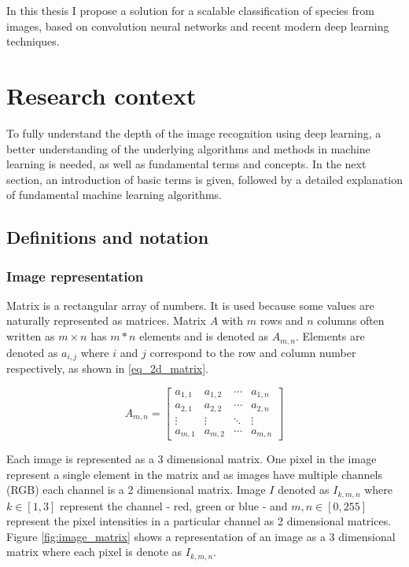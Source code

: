 \documentclass[times, utf8, diplomski]{fer}
\begin{document}
In this thesis I propose a solution for a scalable classification of species from images, based on convolution neural networks and recent modern deep learning techniques.

\chapter{Research context}
To fully understand the depth of the image recognition using deep learning, a better understanding of the underlying algorithms and methods in machine learning is needed, as well as fundamental terms and concepts. In the next section, an introduction of basic terms is given, followed by a detailed explanation of fundamental machine learning algorithms.

\section{Definitions and notation}

\subsection{Image representation}
Matrix is a rectangular array of numbers. It is used because some values are naturally represented as matrices. Matrix $A$ with $m$ rows and $n$ columns often written as $m \times n$ has $m*n$ elements and is denoted as $A_{m,n}$. Elements are denoted as $a_{i,j}$ where $i$ and $j$ correspond to the row and column number respectively, as shown in \ref{eq_2d_matrix}. 

\begin{equation} \label{eq_2d_matrix}
A_{m,n} = 
 \begin{bmatrix}
  a_{1,1} & a_{1,2} & \cdots & a_{1,n} \\
  a_{2,1} & a_{2,2} & \cdots & a_{2,n} \\
  \vdots  & \vdots  & \ddots & \vdots  \\
  a_{m,1} & a_{m,2} & \cdots & a_{m,n} 
 \end{bmatrix}
\end{equation}


Each image is represented as a 3 dimensional matrix. One pixel in the image represent a single element in the matrix and as images have multiple channels (RGB) each channel is a 2 dimensional matrix. Image $I$ denoted as $I_{k,m,n}$ where $k\in[1,3]$ represent the channel - red, green or blue - and $m,n\in[0,255]$ represent the pixel intensities in a particular channel as 2 dimensional matrices. Figure \ref{fig:image_matrix} shows a representation of an image as a 3 dimensional matrix where each pixel is denote as $I_{k,m,n}$.
\end{document}
